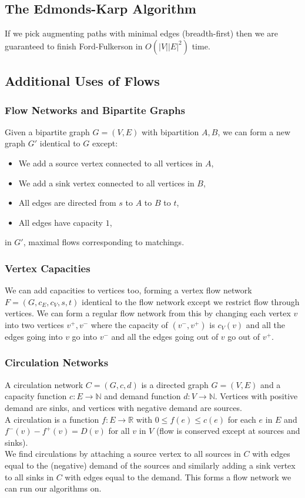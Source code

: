\subsection{The Edmonds-Karp Algorithm}

If we pick augmenting paths with minimal edges (breadth-first) then we are guaranteed to 
finish Ford-Fulkerson in $O(|V||E|^2)$ time.

\subsection{Additional Uses of Flows}

\subsubsection{Flow Networks and Bipartite Graphs}

Given a bipartite graph $G = (V, E)$ with bipartition $A, B$, we can form a new graph
$G'$ identical to $G$ except: \begin{itemize}
  \item We add a source vertex connected to all vertices in $A$,
  \item We add a sink vertex connected to all vertices in $B$,
  \item All edges are directed from $s$ to $A$ to $B$ to $t$,
  \item All edges have capacity $1$,
\end{itemize} in $G'$, maximal flows corresponding to matchings.

\subsubsection{Vertex Capacities}

We can add capacities to vertices too, forming a vertex flow network 
$F = (G, c_E, c_V, s, t)$ identical to the flow network except we restrict flow through
vertices. We can form a regular flow network from this by changing each vertex $v$
into two vertices $v^+, v^-$ where the capacity of $(v^-, v^+)$ is $c_V(v)$ and
all the edges going into $v$ go into $v^-$ and all the edges going
out of $v$ go out of $v^+$.

\subsubsection{Circulation Networks}

A circulation network $C = (G, c, d)$ is a directed graph $G = (V, E)$ and a
capacity function $c : E \to \mathbb{N}$ and demand function $d : V \to \mathbb{N}$.
Vertices with positive demand are sinks, and vertices with negative demand are sources.
\\[\baselineskip]
A circulation is a function $f : E \to \mathbb{R}$ with $0 \leq f(e) \leq c(e)$ for each
$e$ in $E$ and $f^-(v) - f^+(v) = D(v)$ for all $v$ in $V$ (flow is conserved except at
sources and sinks).
\\[\baselineskip]
We find circulations by attaching a source vertex to all sources in $C$ with edges equal
to the (negative) demand of the sources and similarly adding a sink vertex to all
sinks in $C$ with edges equal to the demand. This forms a flow network we can run our 
algorithms on.
